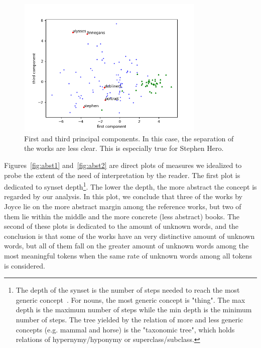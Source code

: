 \documentclass[12pt,fleqn]{article}
\begin{document}
\begin{figure}[!htbp] %
\vspace{-2pt}
\begin{center}
\includegraphics[height=6.7cm,width=9cm]{figs/pca2}%
\caption{First and third principal components.
    In this case, the separation of the works are less clear.
    This is especially true for Stephen Hero.}
\label{fig:pca2}%
\end{center}
\end{figure}


Figures~\ref{fig:abst1} and~\ref{fig:abst2} are direct plots of measures
we idealized to probe the extent of the need of interpretation by the reader.
The first plot is dedicated to synset depth\footnote{The
depth of the synset is the number of steps needed to reach the most generic concept~\citep{wordnet}.
For nouns, the most generic concept is "thing".
The max depth is the maximum number of steps while the min depth is the minimum number
of steps.
The tree yielded by the relation of more and less generic concepts (e.g. mammal and horse)
is the "taxonomic tree",
which holds relations of hypernymy/hyponymy or superclass/subclass.}.
The lower the depth, the more abstract the concept is regarded by our analysis.
In this plot, we conclude that three of the works by Joyce lie on
the more abstract margin among the reference works,
but two of them lie within the middle and the more concrete (less abstract)
books.
The second of these plots is dedicated to the amount of unknown words,
and the conclusion is that some of the works have an very distinctive amount
of unknown words, but all of them fall on the greater amount of unknown words
among the most meaningful tokens when the same rate of unknown words among all tokens is considered.
\end{document}

